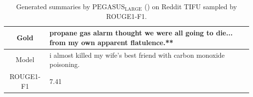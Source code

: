 \begin{table}[bth!]
\begin{tabular}{c|p{}}
\\ \hline
Gold & 
propane gas alarm thought we were all going to die... from my own apparent flatulence.**
\\ \hline
Model & 
i almost killed my wife's best friend with carbon monoxide poisoning.
\\ \hline
ROUGE1-F1 & 
7.41
\\ \hline
\end{tabular}
\caption{Generated summaries by $\text{PEGASUS}_{\text{LARGE}}$ (\gnews) on Reddit TIFU sampled by ROUGE1-F1.}
\end{table}
